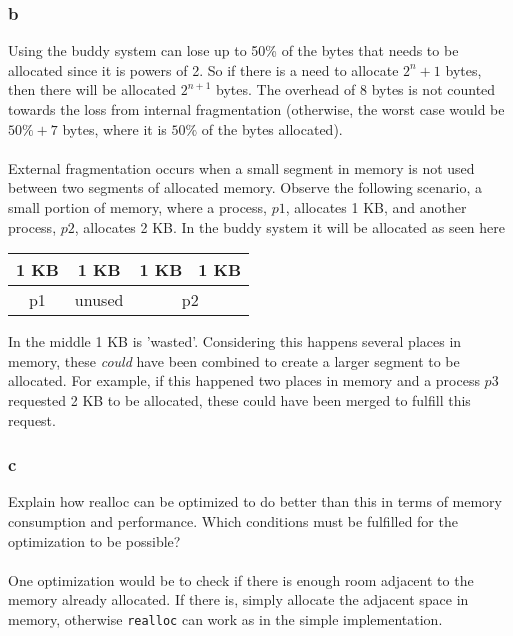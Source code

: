\documentclass[12pt]{article}
\begin{document}
\subsubsection{b}
Using the buddy system can lose up to 50\% of the bytes that needs to be allocated since it is powers of 2. So if there is a need to allocate $2^n+1$ bytes, then there will be allocated $2^{n+1}$ bytes. The overhead of 8 bytes is not counted towards the loss from internal fragmentation (otherwise, the worst case would be $50\%+7$ bytes, where it is $50\%$ of the bytes allocated).\\
\\
External fragmentation occurs when a small segment in memory is not used between two segments of allocated memory. Observe the following scenario, a small portion of memory, where a process, $p1$, allocates 1 KB, and another process, $p2$, allocates 2 KB. In the buddy system it will be allocated as seen here
\begin{center}
\begin{tabular}{|c|c|c|c|}
\hline 
1 KB & 1 KB & 1 KB & 1 KB \\ 
\hline 
p1 & unused & \multicolumn{2}{c|}{p2} \\ 
\hline 
\end{tabular}
\end{center}
$ $
\\
In the middle 1 KB is 'wasted'. Considering this happens several places in memory, these \textit{could} have been combined to create a larger segment to be allocated. For example, if this happened two places in memory and a process $p3$ requested 2 KB to be allocated, these could have been merged to fulfill this request.

\subsubsection{c}
Explain how realloc can be optimized to do better than this in terms of memory consumption and performance. Which conditions must be fulfilled for the optimization to be possible?\\
\\
One optimization would be to check if there is enough room adjacent to the memory already allocated. If there is, simply allocate the adjacent space in memory, otherwise \texttt{realloc} can work as in the simple implementation.
\end{document}
